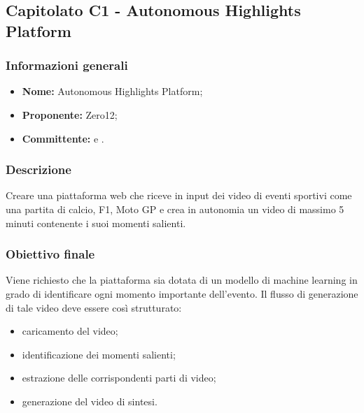 \subsection{Capitolato C1 - Autonomous Highlights Platform}

\subsubsection{Informazioni generali}
	\begin{itemize}
		\item \textbf{Nome:} Autonomous Highlights Platform; 
		\item \textbf{Proponente:} Zero12;
		\item \textbf{Committente:} \TV{} e \RC{}. 
	\end{itemize}

\subsubsection{Descrizione}
Creare una piattaforma web che riceve in input dei video di eventi sportivi come una partita di calcio, F1, Moto GP e crea in autonomia un video di massimo 5 minuti contenente i suoi momenti salienti. 

\subsubsection{Obiettivo finale}
Viene richiesto che la piattaforma sia dotata di un modello di machine learning in grado di identificare ogni momento importante dell’evento.
Il flusso di generazione di tale video deve essere così strutturato:
	\begin{itemize}
		\item caricamento del video;
		\item identificazione dei momenti salienti;
		\item estrazione delle corrispondenti parti di video;
		\item generazione del video di sintesi. 
	\end{itemize}

